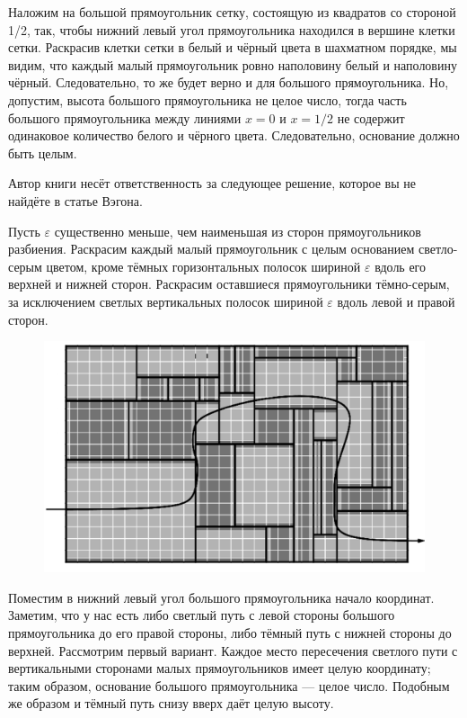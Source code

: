 \medskip

Наложим на большой прямоугольник сетку, состоящую из квадратов со стороной 1/2, так, чтобы нижний левый угол прямоугольника находился в вершине клетки сетки.
Раскрасив клетки сетки в белый и чёрный цвета в шахматном порядке, 
мы видим, что каждый малый прямоугольник ровно наполовину белый и наполовину чёрный.
Следовательно, то же будет верно и для большого прямоугольника.
Но, допустим, высота большого прямоугольника не целое число, тогда часть 
большого прямоугольника между линиями $x=0$ и $x=1/2$ не содержит одинаковое количество белого и чёрного цвета.
Следовательно, основание должно быть целым.\heart

Автор книги несёт ответственность за следующее решение, которое вы не найдёте в статье Вэгона.

Пусть $\varepsilon$ существенно меньше, чем наименьшая из сторон прямоугольников разбиения.
Раскрасим каждый малый прямоугольник с целым основанием светло-серым цветом, кроме тёмных горизонтальных полосок шириной $\varepsilon$ вдоль его верхней и нижней сторон.
Раскрасим оставшиеся прямоугольники тёмно-серым, за исключением светлых вертикальных полосок шириной $\varepsilon$ вдоль левой и правой сторон.

\begin{figure}[h!]
\centering
\includegraphics[scale=0.5]{Figs/Insight/green}
\end{figure}

Поместим в нижний левый угол большого прямоугольника начало координат.
Заметим, что у нас есть либо светлый путь с левой стороны большого прямоугольника до его правой стороны, либо тёмный путь с нижней стороны до верхней.
Рассмотрим первый вариант.
Каждое место пересечения светлого пути с вертикальными сторонами малых прямоугольников имеет целую координату; таким образом, основание большого прямоугольника --- целое число.
Подобным же образом и тёмный путь снизу вверх даёт целую высоту.

